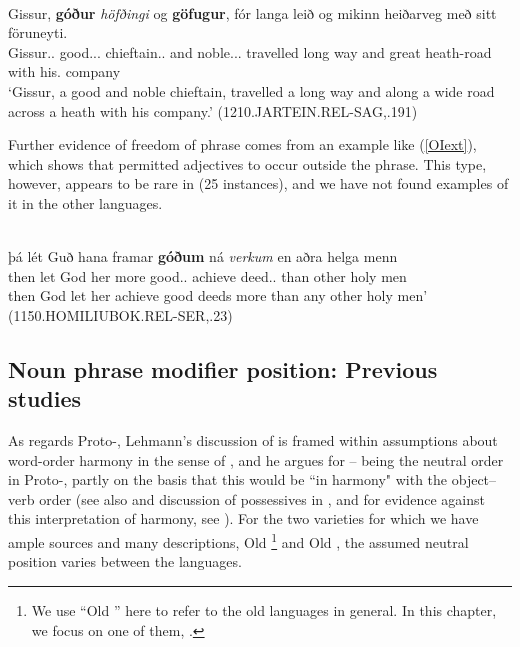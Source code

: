 \documentclass[output=paper,colorlinks,citecolor=brown,draft]{langscibook}
\begin{document}
\ea\label{OIflankconj}
\\
\gll Gissur, \textbf{góður} \textit{höfðingi} og \textbf{göfugur}, fór langa leið og mikinn heiðarveg með sitt föruneyti.\\
Gissur.\NOM.\SG{} good.\NOM.\SG.\STR{} chieftain.\NOM.\SG{} and noble.\NOM.\SG.\STR{} travelled long way and great heath-road with his.\REFL{} company\\
\glt `Gissur, a good and noble chieftain, travelled a long way and along a wide road across a heath with his company.' (1210.JARTEIN.REL-SAG,.191)
\z

Further evidence of freedom of  phrase  comes from an example like (\ref{OIext}), which shows that  permitted  adjectives to occur outside the  phrase. This type, however, appears to be rare in  (25 instances), and we have not found examples of it in the other languages.

\ea\label{OIext}
\\
\gll þá lét Guð hana framar \textbf{góðum} ná \textit{verkum} en aðra helga menn\\
	then let God her more good.\DAT.\PL{} achieve deed.\DAT.\PL{} than other holy men\\
\glt then God let her achieve good deeds more than any other holy men' (1150.HOMILIUBOK.REL-SER,.23)
\z

\subsection{Noun phrase modifier position: Previous studies}\label{ssectprev}
\largerpage
As regards Proto-, Lehmann’s \citeyearpar{Lehmann72} discussion of  is framed within assumptions about word-order harmony in the sense of \citet{Greenberg63}, and he argues for – being the neutral order in Proto-, partly on the basis that this would be “in harmony" with the object–verb order (see also \citealt{Lehmann0507} and discussion of possessives in \citealt{Braunmuller82}, and for evidence against this interpretation of  harmony, see \citealt{Dryer92}). For the two varieties for which we have ample sources and many descriptions, Old \footnote{We use ``Old '' here to refer to the old  languages in general. In this chapter, we focus on one of them, .} and Old , the assumed neutral position varies between the languages.  
\end{document}

